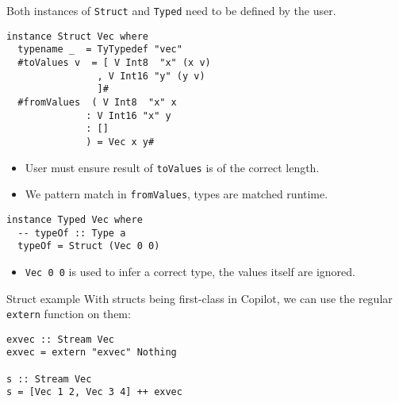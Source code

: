 \documentclass{beamer}
\begin{document}
\begin{frame}[fragile]
Both instances of \texttt{Struct} and \texttt{Typed} need to be defined by the
user.
\begin{lstlisting}
instance Struct Vec where
  typename _  = TyTypedef "vec"
  #toValues v  = [ V Int8  "x" (x v)
                , V Int16 "y" (y v)
                ]#
  #fromValues  ( V Int8  "x" x
              : V Int16 "x" y
              : []
              ) = Vec x y#
\end{lstlisting}
\pause
\begin{itemize}
  \item User must ensure result of \texttt{toValues} is of the correct length.
  \item We pattern match in \texttt{fromValues}, types are matched runtime.
\end{itemize}
\end{frame}

\begin{frame}[fragile]
\begin{lstlisting}
instance Typed Vec where
  -- typeOf :: Type a
  typeOf = Struct (Vec 0 0)
\end{lstlisting}
\begin{itemize}
  \item \texttt{Vec 0 0} is used to infer a correct type, the values itself are
  ignored.
\end{itemize}
\end{frame}


\begin{frame}[fragile]{Struct example}
With structs being first-class in Copilot, we can use the regular
\texttt{extern} function on them:
\begin{lstlisting}
exvec :: Stream Vec
exvec = extern "exvec" Nothing

s :: Stream Vec
s = [Vec 1 2, Vec 3 4] ++ exvec
\end{lstlisting}
\end{frame}
\end{document}
